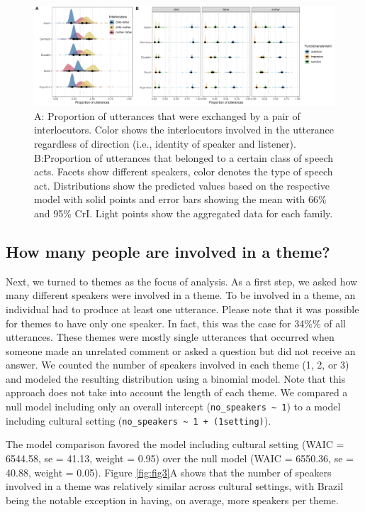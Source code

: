 \documentclass[
  man,floatsintext]{apa6}
\begin{document}
\begin{figure}
\includegraphics[width=1\linewidth]{../visuals/fig2} \caption{A: Proportion of utterances that were exchanged by a pair of interlocutors. Color shows the interlocutors involved in the utterance regardless of direction (i.e., identity of speaker and listener). B:Proportion of utterances that belonged to a certain class of speech acts. Facets show different speakers, color denotes the type of speech act. Distributions show the predicted values based on the respective model with solid points and error bars showing the mean with 66\% and 95\% CrI. Light points show the aggregated data for each family.}\label{fig:fig2}
\end{figure}

\hypertarget{how-many-people-are-involved-in-a-theme}{%
\subsection{How many people are involved in a theme?}\label{how-many-people-are-involved-in-a-theme}}

Next, we turned to themes as the focus of analysis. As a first step, we asked how many different speakers were involved in a theme. To be involved in a theme, an individual had to produce at least one utterance. Please note that it was possible for themes to have only one speaker. In fact, this was the case for 34\%\% of all utterances. These themes were mostly single utterances that occurred when someone made an unrelated comment or asked a question but did not receive an answer. We counted the number of speakers involved in each theme (1, 2, or 3) and modeled the resulting distribution using a binomial model. Note that this approach does not take into account the length of each theme. We compared a null model including only an overall intercept (\texttt{no\_speakers\ \textasciitilde{}\ 1}) to a model including cultural setting (\texttt{no\_speakers\ \textasciitilde{}\ 1\ +\ (1\textbar{}setting)}).

The model comparison favored the model including cultural setting (WAIC = 6544.58, se = 41.13, weight = 0.95) over the null model (WAIC = 6550.36, se = 40.88, weight = 0.05). Figure \ref{fig:fig3}A shows that the number of speakers involved in a theme was relatively similar across cultural settings, with Brazil being the notable exception in having, on average, more speakers per theme.
\end{document}
